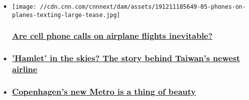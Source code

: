 \begin{itemize}
\item
  \href{/travel/article/cell-phone-calls-airplanes/index.html}{}

  \texttt{[image: //cdn.cnn.com/cnnnext/dam/assets/191211185649-05-phones-on-planes-texting-large-tease.jpg]}

  \hypertarget{are-cell-phone-calls-on-airplane-flights-inevitable}{%
  \subsubsection{\texorpdfstring{\href{/travel/article/cell-phone-calls-airplanes/index.html}{Are
  cell phone calls on airplane flights
  inevitable?}}{Are cell phone calls on airplane flights inevitable?}}\label{are-cell-phone-calls-on-airplane-flights-inevitable}}
\item
  \hypertarget{hamlet-in-the-skies-the-story-behind-taiwans-newest-airline}{%
  \subsubsection{\texorpdfstring{\href{/travel/article/starlux-airlines-taiwan/index.html}{'Hamlet'
  in the skies? The story behind Taiwan's newest
  airline}}{'Hamlet' in the skies? The story behind Taiwan's newest airline}}\label{hamlet-in-the-skies-the-story-behind-taiwans-newest-airline}}
\item
  \hypertarget{copenhagens-new-metro-is-a-thing-of-beauty}{%
  \subsubsection{\texorpdfstring{\href{/travel/article/metro-cityring-copenhagen-denmark/index.html}{Copenhagen's
  new Metro is a thing of
  beauty}}{Copenhagen's new Metro is a thing of beauty}}\label{copenhagens-new-metro-is-a-thing-of-beauty}}
\end{itemize}

